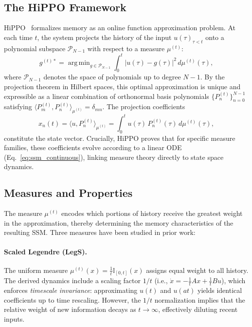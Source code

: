 \documentclass{article}
\theoremstyle{plain}
\theoremstyle{definition}
\theoremstyle{remark}
\DeclareMathOperator*{\argmin}{arg\,min}
\begin{document}
\subsection{The HiPPO Framework}
\label{subsec:hippo}

HiPPO~\citep{gu2020hippo} formalizes memory as an online function approximation problem. At each time $t$, the system projects the history of the input $u(\tau)_{\tau < t}$ onto a polynomial subspace $\mathcal{P}_{N-1}$ with respect to a measure $\mu^{(t)}$:
\begin{equation}
	g^{(t)*} = \argmin_{g \in \mathcal{P}_{N-1}} \int_0^t \bigl|u(\tau) - g(\tau)\bigr|^2 \, d\mu^{(t)}(\tau),
	\label{eq:hippo_projection}
\end{equation}
where $\mathcal{P}_{N-1}$ denotes the space of polynomials up to degree $N-1$. By the projection theorem in Hilbert spaces, this optimal approximation is unique and expressible as a linear combination of orthonormal basis polynomials $\{P_n^{(t)}\}_{n=0}^{N-1}$ satisfying $\langle P_m^{(t)}, P_n^{(t)} \rangle_{\mu^{(t)}} = \delta_{mn}$.
The projection coefficients
\begin{equation}
	x_n(t) = \langle u, P_n^{(t)} \rangle_{\mu^{(t)}} = \int_0^t u(\tau) \, P_n^{(t)}(\tau) \, d\mu^{(t)}(\tau),
	\label{eq:projection_coeffs}
\end{equation}
constitute the state vector. Crucially, HiPPO proves that for specific measure families, these coefficients evolve according to a linear ODE (Eq.~\ref{eq:ssm_continuous}), linking measure theory directly to state space dynamics.

\subsection{Measures and Properties}
\label{subsec:measures}

The measure $\mu^{(t)}$ encodes which portions of history receive the greatest weight in the approximation, thereby determining the memory characteristics of the resulting SSM.
Three measures have been studied in prior work:

\paragraph{Scaled Legendre (LegS).}
The uniform measure $\mu^{(t)}(x) = \frac{1}{t}\mathbb{I}_{[0,t]}(x)$ assigns equal weight to all history. The derived dynamics include a scaling factor $1/t$ (i.e., $\dot{x} = -\frac{1}{t}Ax + \frac{1}{t}Bu$), which enforces \textit{timescale invariance}: approximating $u(t)$ and $u(at)$ yields identical coefficients up to time rescaling. However, the $1/t$ normalization implies that the relative weight of new information decays as $t \to \infty$, effectively diluting recent inputs.
\end{document}
